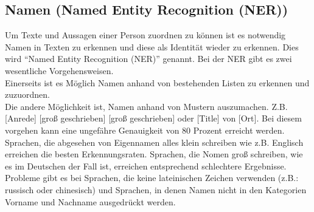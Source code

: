 \documentclass[twoside,a4paper]{article}
\begin{document}
\subsection{Namen (Named Entity Recognition (NER))}
Um Texte und Aussagen einer Person zuordnen zu können ist es notwendig Namen in Texten zu erkennen und diese als Identität wieder zu erkennen. Dies wird \enquote{Named Entity Recognition (NER)} genannt. Bei der NER gibt es zwei wesentliche Vorgehensweisen. \\
Einerseits ist es Möglich Namen anhand von bestehenden Listen zu erkennen und zuzuordnen.\\
Die andere Möglichkeit ist, Namen anhand von Mustern auszumachen. Z.B. [Anrede] [groß geschrieben] [groß geschrieben] oder [Title] von [Ort]. Bei diesem vorgehen kann eine ungefähre Genauigkeit von 80 Prozent\cite{challanges_in_osint} erreicht werden. Sprachen, die abgesehen von Eigennamen alles klein schreiben wie z.B. Englisch erreichen die besten Erkennungsraten. Sprachen, die Nomen groß schreiben, wie es im Deutschen der Fall ist, erreichen entsprechend schlechtere Ergebnisse. Probleme gibt es bei Sprachen, die keine lateinischen Zeichen verwenden (z.B.: russisch oder chinesisch) und Sprachen, in denen Namen nicht in den Kategorien Vorname und Nachname ausgedrückt werden.
\end{document}
